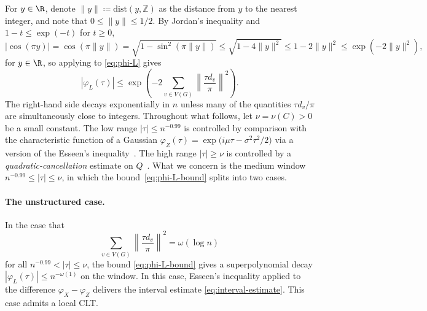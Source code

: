 For $y \in \R$, denote $\|y\| \coloneqq \mathrm{dist}(y, \mathbb{Z})$ as the distance from $y$ to the nearest integer, and note that $0 \leq \|y\| \leq 1/2$. By Jordan's inequality and $1 - t \leq \exp(-t)$ for $t \geq 0$, 
\[
  |\cos(\pi y)| = \cos(\pi \|y\|) = \sqrt{1 \!-\! \sin^2(\pi \|y\|)} \leq \sqrt{1 \!-\! 4\|y\|^2} \leq 1 - 2\|y\|^2 \leq \exp(-2\|y\|^2),
\]
for $y \in \R$, so applying to \eqref{eq:phi-L} gives
\begin{equation}
\label{eq:phi-L-bound}
|\varphi_L(\tau)| \leq \exp\left(-2\sum_{v \in V(G)} \left\|\frac{\tau d_v}{\pi}\right\|^2\right).
\end{equation}
The right-hand side decays exponentially in $n$ unless many of the quantities $\tau d_v/\pi$ are simultaneously close to integers. Throughout what follows, let $\nu = \nu(C) > 0$ be a small constant. The low range $|\tau| \leq n^{-0.99}$ is controlled by comparison with the characteristic function of a Gaussian $\varphi_Z(\tau) = \exp\bigl(i \mu \tau - \sigma^2 \tau^2/2\bigr)$ via a version of the Esseen's inequality~\cite[Lemma 6.1]{Kwan_2023}. The high range $|\tau| \geq \nu$ is controlled by a \textit{quadratic-cancellation} estimate on $Q$~\cite[Section 8]{Kwan_2023}. What we concern is the medium window $n^{-0.99} \leq |\tau| \leq \nu$, in which the bound~\eqref{eq:phi-L-bound} splits into two cases. 

\paragraph{The unstructured case.} In the case that
\[
  \sum_{v \in V(G)} \left\|\frac{\tau d_v}{\pi}\right\|^2 = \omega(\log n)
\]
for all $n^{-0.99} < |\tau| \leq \nu$, the bound \eqref{eq:phi-L-bound} gives a superpolynomial decay $|\varphi_L(\tau)| \leq n^{-\omega(1)}$ on the window. In this case, Esseen's inequality applied to the difference $\varphi_X - \varphi_Z$ delivers the interval estimate \eqref{eq:interval-estimate}. This case admits a local CLT.

